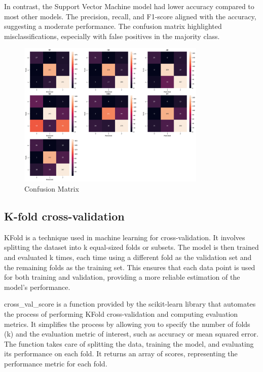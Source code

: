 In contrast, the Support Vector Machine model had lower accuracy compared to most other models. The precision, recall, and F1-score aligned with the accuracy, suggesting a moderate performance. The confusion matrix highlighted misclassifications, especially with false positives in the majority class.

\begin{figure}[h!]
    \centering
    \includegraphics[width=0.8\textwidth]{imgs/confusion matrix.png}
    \caption{Confusion Matrix}
    \label{fig:ConfusionMatrix}
\end{figure}

\subsection{K-fold cross-validation}
KFold is a technique used in machine learning for cross-validation. It involves splitting the dataset into k equal-sized folds or subsets. The model is then trained and evaluated k times, each time using a different fold as the validation set and the remaining folds as the training set. This ensures that each data point is used for both training and validation, providing a more reliable estimation of the model's performance.

cross\_val\_score is a function provided by the scikit-learn library that automates the process of performing KFold cross-validation and computing evaluation metrics. It simplifies the process by allowing you to specify the number of folds (k) and the evaluation metric of interest, such as accuracy or mean squared error. The function takes care of splitting the data, training the model, and evaluating its performance on each fold. It returns an array of scores, representing the performance metric for each fold.

